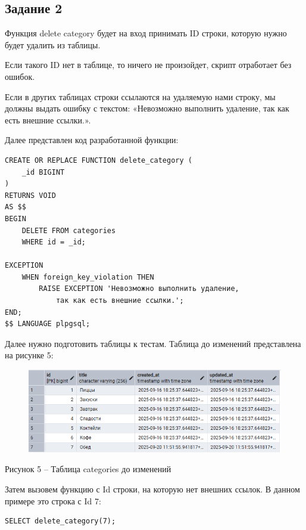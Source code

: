 \documentclass[a4paper,14pt]{extarticle}
\begin{document}
  \subsection*{Задание 2}
  Функция delete category будет на вход принимать ID строки, которую нужно будет удалить из таблицы.

  Если такого ID нет в таблице, то ничего не произойдет, скрипт отработает без ошибок.

  Если в других таблицах строки ссылаются на удаляемую нами строку, мы должны выдать ошибку с текстом: «Невозможно выполнить удаление, так как есть внешние ссылки.».

  Далее представлен код разработанной функции:

  \noindent
  \begin{Verbatim}[tabsize=4,fontsize=\small]
CREATE OR REPLACE FUNCTION delete_category (
    _id BIGINT
)
RETURNS VOID
AS $$
BEGIN
    DELETE FROM categories
    WHERE id = _id;

EXCEPTION
    WHEN foreign_key_violation THEN
        RAISE EXCEPTION 'Невозможно выполнить удаление,
            так как есть внешние ссылки.';
END;
$$ LANGUAGE plpgsql;
  \end{Verbatim}

  Далее нужно подготовить таблицы к тестам. Таблица до изменений представлена на рисунке 5:

  \begin{figure}[h]
    \centering
    \includegraphics[width=1\linewidth]{img/t-1-4}
  \end{figure}
  \begin{center}
    Рисунок 5 – Таблица categories до изменений
  \end{center}

  Затем вызовем функцию с Id строки, на которую нет внешних ссылок. В данном примере это строка с Id 7:

  \noindent
  \begin{Verbatim}[tabsize=4,fontsize=\small]
SELECT delete_category(7);
  \end{Verbatim}
\end{document}
